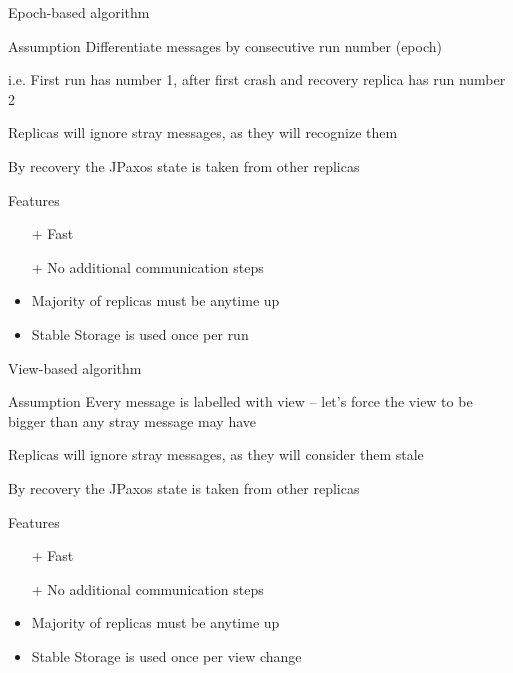\documentclass[hyperref={pdfpagelabels=true},11pt,compress,trans]{beamer}
\begin{document}
\begin{frame}{Epoch-based algorithm}
 \begin{block}{Assumption}
  Differentiate messages by consecutive run number (epoch)

{\footnotesize i.e. First run has number 1, after first crash and recovery replica has run number 2}

  Replicas will ignore stray messages, as they will recognize them

  By recovery the JPaxos state is taken from other replicas
 \end{block}
 \begin{block}{Features}
  \vspace{-1em}\vspace{-\parskip}\vspace{-\lineskip}
  \begin{itemize}
   \item[+]  Fast
   \item[+]  No additional communication steps
   \item     Majority of replicas must be anytime up
   \item     Stable Storage is used once per run
  \end{itemize}
 \end{block}
\end{frame}

\begin{frame}{View-based algorithm}
 \begin{block}{Assumption}
  Every message is labelled with view -- let's force the view to be bigger than any stray message may have

  Replicas will ignore stray messages, as they will consider them stale

  By recovery the JPaxos state is taken from other replicas
 \end{block}
 \begin{block}{Features}
  \vspace{-1em}\vspace{-\parskip}\vspace{-\lineskip}
  \begin{itemize}
   \item[+]  Fast
   \item[+]  No additional communication steps
   \item     Majority of replicas must be anytime up
   \item     Stable Storage is used once per view change
  \end{itemize}
 \end{block}
\end{frame}
\end{document}

